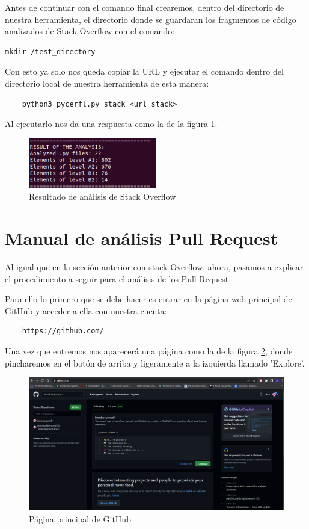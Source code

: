 \documentclass[a4paper, 12pt]{book}
\begin{document}
 
Antes de continuar con el comando final crearemos, dentro del directorio de nuestra herramienta, el directorio donde se guardaran los fragmentos de código analizados de Stack Overflow con el comando:

\begin{verbatim}
mkdir /test_directory
\end{verbatim}

Con esto ya solo nos queda copiar la URL y ejecutar el comando dentro del directorio local de nuestra herramienta de esta manera:

\begin{verbatim}
	python3 pycerfl.py stack <url_stack>
\end{verbatim}

Al ejecutarlo nos da una respuesta como la de la figura \ref{figura:stack4}.

\begin{figure}
	\centering
    \includegraphics[width=0.5\textwidth]{img/stack4}
    \caption{Resultado de análisis de Stack Overflow}
    \label{figura:stack4}
\end{figure}

\section{Manual de análisis Pull Request}

Al igual que en la sección anterior con stack Overflow, ahora, pasamos a explicar el procedimiento a seguir para el análisis de los Pull Request.

Para ello lo primero que se debe hacer es entrar en la página web principal de GitHub y acceder a ella con nuestra cuenta:

\begin{verbatim}
	https://github.com/
\end{verbatim}

Una vez que entremos nos aparecerá una página como la de la figura \ref{figura:git1}, donde pincharemos en el botón de arriba y ligeramente a la izquierda llamado 'Explore'.

\begin{figure}
    \includegraphics[bb=0 0 800 600, width=12cm, keepaspectratio]{img/git1}
    \caption{Página principal de GitHub}
    \label{figura:git1}
 \end{figure}
 
\end{document}

